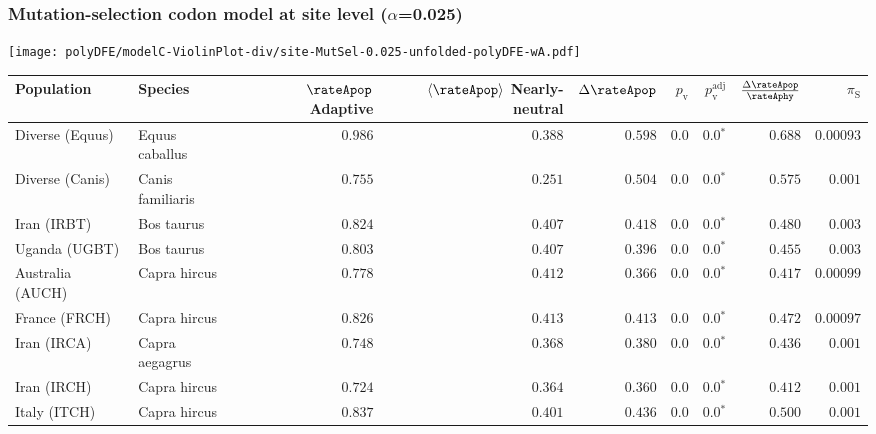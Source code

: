 \subsubsection*{Mutation-selection codon model at site level ($\alpha$=0.025)}
\begin{center}
    \texttt{[image: polyDFE/modelC-ViolinPlot-div/site-MutSel-0.025-unfolded-polyDFE-wA.pdf]}
    \begin{adjustbox}{width = 1\textwidth}
        \begin{tabular}{|l|l|r|r|r|r|r|r|r|}
            \toprule
            Population & Species & \specialcell{$\rateApop$ \\ Adaptive}                & \specialcell{$\left< \rateApop \right>$ \\ Nearly-neutral}                & $\Delta \rateApop $    & $p_{\mathrm{v}}$ & $p_{\mathrm{v}}^{\mathrm{adj}}$ & $\frac{\Delta\rateApop}{\rateAphy}$ & $\pi_{\textrm{S}}$    \\
            \midrule
            Diverse (Equus)                    & Equus caballus          & $ 0.986$ & $ 0.388$ & $ 0.598$ & $0.0$    & $\bm{0.0{^*}}$ & $ 0.688$ & $0.00093$  \\
            Diverse (Canis)                  & Canis familiaris          & $ 0.755$ & $ 0.251$ & $ 0.504$ & $0.0$    & $\bm{0.0{^*}}$ & $ 0.575$ & $ 0.001$ \\
            Iran (IRBT)               & Bos taurus        & $ 0.824$ & $ 0.407$ & $ 0.418$ & $0.0$    & $\bm{0.0{^*}}$ & $ 0.480$ & $ 0.003$ \\
            Uganda (UGBT)                  & Bos taurus        & $ 0.803$ & $ 0.407$ & $ 0.396$ & $0.0$    & $\bm{0.0{^*}}$ & $ 0.455$ & $ 0.003$ \\
            Australia (AUCH)                    & Capra hircus      & $ 0.778$ & $ 0.412$ & $ 0.366$ & $0.0$    & $\bm{0.0{^*}}$ & $ 0.417$ & $0.00099$ \\
            France (FRCH)                    & Capra hircus        & $ 0.826$ & $ 0.413$ & $ 0.413$ & $0.0$    & $\bm{0.0{^*}}$ & $ 0.472$ & $0.00097$ \\
            Iran (IRCA)                   & Capra aegagrus        & $ 0.748$ & $ 0.368$ & $ 0.380$ & $0.0$    & $\bm{0.0{^*}}$ & $ 0.436$ & $ 0.001$ \\
            Iran (IRCH)                 & Capra hircus        & $ 0.724$ & $ 0.364$ & $ 0.360$ & $0.0$    & $\bm{0.0{^*}}$ & $ 0.412$ & $ 0.001$ \\
            Italy (ITCH)                    & Capra hircus          & $ 0.837$ & $ 0.401$ & $ 0.436$ & $0.0$    & $\bm{0.0{^*}}$ & $ 0.500$ & $ 0.001$  \\

\end{tabular}
\end{adjustbox}
\end{center}
